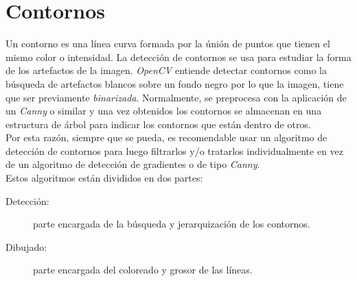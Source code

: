\section{Contornos}\label{tecnica:contornos}
Un contorno es una línea curva formada por la únión de puntos que
tienen el mismo color o intensidad. La detección de contornos se usa
para estudiar la forma de los artefactos de la imagen. \emph{OpenCV}
entiende detectar contornos como la búsqueda de artefactos blancos
sobre un fondo negro por lo que la imagen, tiene que ser previamente
\emph{binarizada}. Normalmente, se preprocesa con la aplicación de un
\emph{Canny} o similar y una vez obtenidos los contornos se almacenan
en una estructura de árbol para indicar los contornos que están dentro
de otros. \\
Por esta razón, siempre que se pueda, es recomendable usar un
algoritmo de detección de contornos para luego filtrarlos y/o
tratarlos individualmente en vez de un algoritmo de detección de
gradientes o de tipo \emph{Canny}.\\
Estos algoritmos están divididos en dos partes:
\begin{description}
\item[Detección:] parte encargada de la búsqueda y jerarquización de
  los contornos.
\item[Dibujado:] parte encargada del coloreado y grosor de las líneas.
\end{description}

